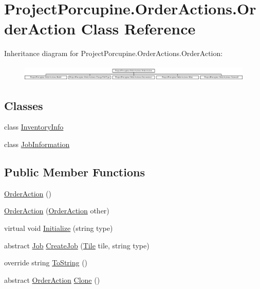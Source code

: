 \hypertarget{class_project_porcupine_1_1_order_actions_1_1_order_action}{}\section{Project\+Porcupine.\+Order\+Actions.\+Order\+Action Class Reference}
\label{class_project_porcupine_1_1_order_actions_1_1_order_action}
Inheritance diagram for Project\+Porcupine.\+Order\+Actions.\+Order\+Action\+:\begin{figure}[H]
\begin{center}
\leavevmode
\includegraphics[height=0.761905cm]{class_project_porcupine_1_1_order_actions_1_1_order_action}
\end{center}
\end{figure}
\subsection*{Classes}
\begin{DoxyCompactItemize}
\item 
class \hyperlink{class_project_porcupine_1_1_order_actions_1_1_order_action_1_1_inventory_info}{Inventory\+Info}
\item 
class \hyperlink{class_project_porcupine_1_1_order_actions_1_1_order_action_1_1_job_information}{Job\+Information}
\end{DoxyCompactItemize}
\subsection*{Public Member Functions}
\begin{DoxyCompactItemize}
\item 
\hyperlink{class_project_porcupine_1_1_order_actions_1_1_order_action_ae926fa2ef749eb5cdcea57fd280cc909}{Order\+Action} ()
\item 
\hyperlink{class_project_porcupine_1_1_order_actions_1_1_order_action_acd028fa3e0960dcfda64caa7698fd558}{Order\+Action} (\hyperlink{class_project_porcupine_1_1_order_actions_1_1_order_action}{Order\+Action} other)
\item 
virtual void \hyperlink{class_project_porcupine_1_1_order_actions_1_1_order_action_afb48593caf6e46d965ac5182bcfe1c4b}{Initialize} (string type)
\item 
abstract \hyperlink{class_job}{Job} \hyperlink{class_project_porcupine_1_1_order_actions_1_1_order_action_a84f0d2817e07e351c4a9e86172d8f5b4}{Create\+Job} (\hyperlink{class_tile}{Tile} tile, string type)
\item 
override string \hyperlink{class_project_porcupine_1_1_order_actions_1_1_order_action_a378731f7ccc8444488452f21641e0e20}{To\+String} ()
\item 
abstract \hyperlink{class_project_porcupine_1_1_order_actions_1_1_order_action}{Order\+Action} \hyperlink{class_project_porcupine_1_1_order_actions_1_1_order_action_a34bd9be15055adc6c5397db3aab7bc5f}{Clone} ()
\end{DoxyCompactItemize}
